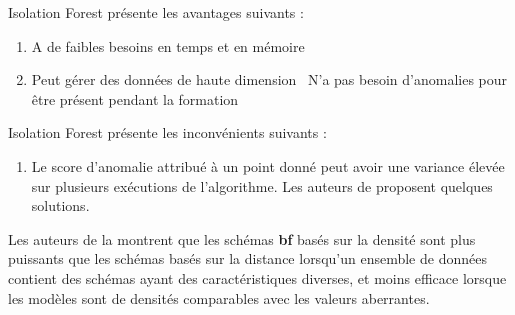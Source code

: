Isolation Forest présente les avantages suivants :
\begin{enumerate}
\item A de faibles besoins en temps et en mémoire
\item Peut gérer des données de haute dimension
\ N'a pas besoin d'anomalies pour être présent pendant la formation
\end{enumerate}

Isolation Forest présente les inconvénients suivants :
\begin{enumerate}
\item Le score d'anomalie attribué à un point donné peut avoir une variance élevée sur plusieurs exécutions de l'algorithme. Les auteurs de \cite{EIF} proposent quelques solutions.
\end{enumerate}

Les auteurs de la \cite{JZ} montrent que les schémas \textbf{bf} basés sur la densité sont plus puissants que les schémas basés sur la distance lorsqu'un ensemble de données contient des schémas ayant des caractéristiques diverses,  et moins efficace lorsque les modèles sont de densités comparables avec les valeurs aberrantes. 
